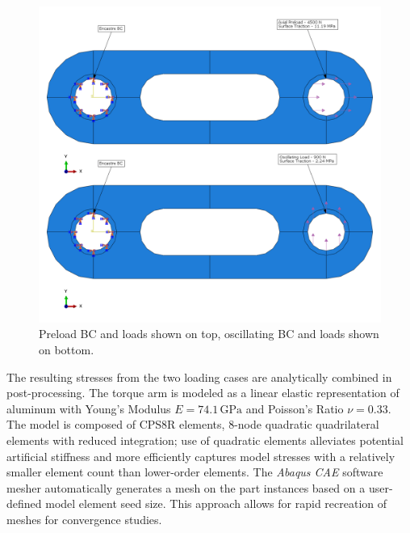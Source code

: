 \documentclass[../main.tex]{subfiles}
\begin{document}
\begin{figure}[h!]
    \centering
    \includegraphics[scale=0.75]{../../images/combined_FBD.png}
    \caption{Preload BC and loads shown on top, oscillating BC and loads shown on bottom.}
    \label{full_FBD}
\end{figure}

The resulting stresses from the two loading cases are analytically combined in post-processing.
The torque arm is modeled as a linear elastic representation of aluminum with Young's Modulus \(E=74.1\,\unit{\giga\pascal}\) and Poisson's Ratio \(\nu=0.33\).
The model is composed of CPS8R elements, 8-node quadratic quadrilateral elements with reduced integration; use of quadratic elements alleviates potential artificial stiffness and more efficiently captures model stresses with a relatively smaller element count than lower-order elements.
The \textit{Abaqus CAE} software mesher automatically generates a mesh on the part instances based on a user-defined model element seed size.
This approach allows for rapid recreation of meshes for convergence studies. 
\end{document}

